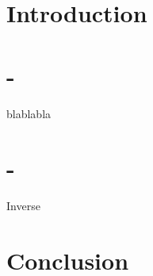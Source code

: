 \section*{Introduction}

\section{-}
blablabla

\section{-}
\begin{algorithm}
	
	\caption{Inverse}\label{alg:Inverse}
\end{algorithm}

\section*{Conclusion}